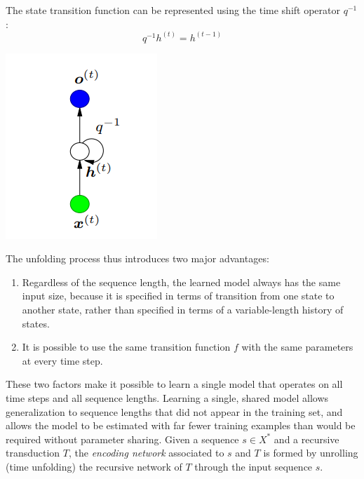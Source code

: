 The state transition function can be represented using the time shift operator $q^{-1}$:
\[q^{-1}h^{(t)} = h^{(t-1)}\]
\begin{center}
    \includegraphics[]{images/time-shift-op.png}
\end{center}
The unfolding process thus introduces two major advantages:
\begin{enumerate}
    \item Regardless of the sequence length, the learned model always has the same input size, because it is specified in terms of transition from one state to another state, rather than specified in terms of a variable-length history of states.

    \item It is possible to use the same transition function $f$ with the same parameters at every time step.
\end{enumerate}
These two factors make it possible to learn a single model that operates on all time steps and all sequence lengths. Learning a single, shared model allows generalization to sequence lengths that did not appear in the training set, and allows the model to be estimated with far fewer training examples than would be required without parameter sharing.\newline\newline
Given a sequence $s \in X^{*}$ and a recursive transduction $T$, the \textit{encoding network} associated to $s$ and $T$ is formed by unrolling (time unfolding) the recursive network of $T$ through the input sequence $s$.
